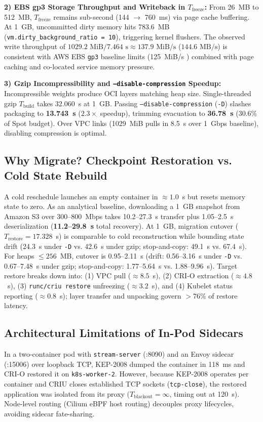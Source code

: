 \documentclass[conference,10pt]{IEEEtran}
\begin{document}
\textbf{2) EBS gp3 Storage Throughput and Writeback in $T_{\text{freeze}}$:} From 26~MB to 512~MB, $T_{\text{freeze}}$ remains sub-second (144 $\to$ 760~ms) via page cache buffering. At 1~GB, uncommitted dirty memory hits 783.6~MB (\texttt{vm.dirty\_background\_ratio = 10}), triggering kernel flushers. The observed write throughput of $1029.2\text{ MiB} / 7.464\text{ s} \approx 137.9\text{ MiB/s}$ ($144.6\text{ MB/s}$) is consistent with AWS EBS \texttt{gp3} baseline limits (125~MiB/s \cite{aws_ebs}) combined with page caching and co-located service memory pressure.

\textbf{3) Gzip Incompressibility and \texttt{--disable-compression} Speedup:} Incompressible weights produce OCI layers matching heap size. Single-threaded gzip $T_{\text{build}}$ takes 32.060~s at 1~GB. Passing \texttt{--disable-compression} (\texttt{-D}) slashes packaging to \textbf{13.743~s} ($2.3\times$ speedup), trimming evacuation to \textbf{36.78~s} (30.6\% of Spot budget). Over VPC links (1029~MiB pulls in 8.5~s over 1~Gbps baseline), disabling compression is optimal.

\subsection{Why Migrate? Checkpoint Restoration vs. Cold State Rebuild}
A cold reschedule launches an empty container in $\approx 1.0$~s but resets memory state to zero. As an analytical baseline, downloading a 1~GB snapshot from Amazon S3 over 300--800~Mbps takes 10.2--27.3~s transfer plus 1.05--2.5~s deserialization (\textbf{11.2--29.8~s} total recovery).
At 1~GB, migration cutover ($T_{\text{restore}} = 17.328$~s) is comparable to cold reconstruction while bounding state drift (24.3~s under \texttt{-D} vs. 42.6~s under gzip; stop-and-copy: 49.1~s vs. 67.4~s). For heaps $\le 256$~MB, cutover is 0.95--2.11~s (drift: 0.56--3.16~s under \texttt{-D} vs. 0.67--7.48~s under gzip; stop-and-copy: 1.77--5.64~s vs. 1.88--9.96~s). Target restore breaks down into: (1) VPC pull ($\approx 8.5$~s), (2) CRI-O extraction ($\approx 4.8$~s), (3) \texttt{runc/criu restore} unfreezing ($\approx 3.2$~s), and (4) Kubelet status reporting ($\approx 0.8$~s); layer transfer and unpacking govern $>76$\% of restore latency.

\subsection{Architectural Limitations of In-Pod Sidecars}
In a two-container pod with \texttt{stream-server} (:8090) and an Envoy sidecar (:15006) over loopback TCP, KEP-2008 dumped the container in 118~ms and CRI-O restored it on \texttt{k8s-worker-2}. However, because KEP-2008 operates per container and CRIU closes established TCP sockets (\texttt{tcp-close}), the restored application was isolated from its proxy ($T_{\text{blackout}} = \infty$, timing out at 120~s). Node-level routing (Cilium eBPF host routing) decouples proxy lifecycles, avoiding sidecar fate-sharing.
\end{document}
